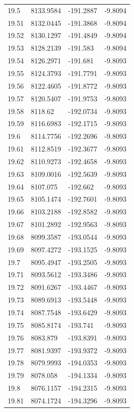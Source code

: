 \begin{table}[H]
\begin{tabular}{llll}
19.5 & 8133.9584 & -191.2887 & -9.8094 \\
19.51 & 8132.0445 & -191.3868 & -9.8094 \\
19.52 & 8130.1297 & -191.4849 & -9.8094 \\
19.53 & 8128.2139 & -191.583 & -9.8094 \\
19.54 & 8126.2971 & -191.681 & -9.8093 \\
19.55 & 8124.3793 & -191.7791 & -9.8093 \\
19.56 & 8122.4605 & -191.8772 & -9.8093 \\
19.57 & 8120.5407 & -191.9753 & -9.8093 \\
19.58 & 8118.62 & -192.0734 & -9.8093 \\
19.59 & 8116.6983 & -192.1715 & -9.8093 \\
19.6 & 8114.7756 & -192.2696 & -9.8093 \\
19.61 & 8112.8519 & -192.3677 & -9.8093 \\
19.62 & 8110.9273 & -192.4658 & -9.8093 \\
19.63 & 8109.0016 & -192.5639 & -9.8093 \\
19.64 & 8107.075 & -192.662 & -9.8093 \\
19.65 & 8105.1474 & -192.7601 & -9.8093 \\
19.66 & 8103.2188 & -192.8582 & -9.8093 \\
19.67 & 8101.2892 & -192.9563 & -9.8093 \\
19.68 & 8099.3587 & -193.0544 & -9.8093 \\
19.69 & 8097.4272 & -193.1525 & -9.8093 \\
19.7 & 8095.4947 & -193.2505 & -9.8093 \\
19.71 & 8093.5612 & -193.3486 & -9.8093 \\
19.72 & 8091.6267 & -193.4467 & -9.8093 \\
19.73 & 8089.6913 & -193.5448 & -9.8093 \\
19.74 & 8087.7548 & -193.6429 & -9.8093 \\
19.75 & 8085.8174 & -193.741 & -9.8093 \\
19.76 & 8083.879 & -193.8391 & -9.8093 \\
19.77 & 8081.9397 & -193.9372 & -9.8093 \\
19.78 & 8079.9993 & -194.0353 & -9.8093 \\
19.79 & 8078.058 & -194.1334 & -9.8093 \\
19.8 & 8076.1157 & -194.2315 & -9.8093 \\
19.81 & 8074.1724 & -194.3296 & -9.8093 \\

\end{tabular}
\end{table}

